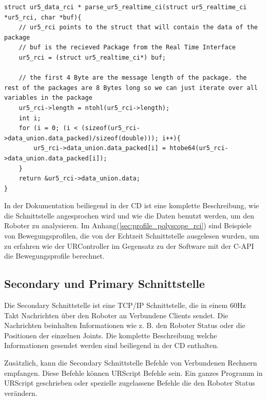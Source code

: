 \begin{lstlisting}[caption={Umwandlung der Byte-Order für Packet über die Echtzeit-Schnittstellen }, label=lst:rci_parse ,captionpos=b]
struct ur5_data_rci * parse_ur5_realtime_ci(struct ur5_realtime_ci *ur5_rci, char *buf){
    // ur5_rci points to the struct that will contain the data of the package
    // buf is the recieved Package from the Real Time Interface
    ur5_rci = (struct ur5_realtime_ci*) buf;

    // the first 4 Byte are the message length of the package. the rest of the packages are 8 Bytes long so we can just iterate over all variables in the package 
    ur5_rci->length = ntohl(ur5_rci->length);
    int i;
    for (i = 0; (i < (sizeof(ur5_rci->data_union.data_packed)/sizeof(double))); i++){
        ur5_rci->data_union.data_packed[i] = htobe64(ur5_rci->data_union.data_packed[i]);
    }
    return &ur5_rci->data_union.data;
}
\end{lstlisting}

In der Dokumentation beiliegend in der CD ist eine komplette Beschreibung, wie die Schnittstelle angesprochen wird und wie die Daten benutzt werden, um den Roboter zu analysieren. Im Anhang(\ref{sec:profile_polyscope_rci}) sind Beispiele von Bewegungsprofilen, die von der Echtzeit Schnittstelle ausgelesen wurden, um zu erfahren wie der URController im Gegensatz zu der Software mit der C-\ac{API} die Bewegungsprofile berechnet.

\subsection{Secondary und Primary Schnittstelle}
\label{urcontrol_spi_gru}

Die Secondary Schnittstelle ist eine \acs{TCP/IP} Schnittstelle, die in einem 60Hz Takt Nachrichten über den Roboter an Verbundene Clients sendet.
Die Nachrichten beinhalten Informationen wie z. B. den Roboter Status oder die Positionen der einzelnen Joints.
Die komplette Beschreibung welche Informationen gesendet werden sind beiliegend in der CD enthalten.

Zusätzlich, kann die Secondary Schnittstelle Befehle von Verbundenen Rechnern empfangen.
Diese Befehle können URScript Befehle sein. Ein ganzes Programm in URScript geschrieben oder spezielle zugelassene Befehle die den Roboter Status verändern.


